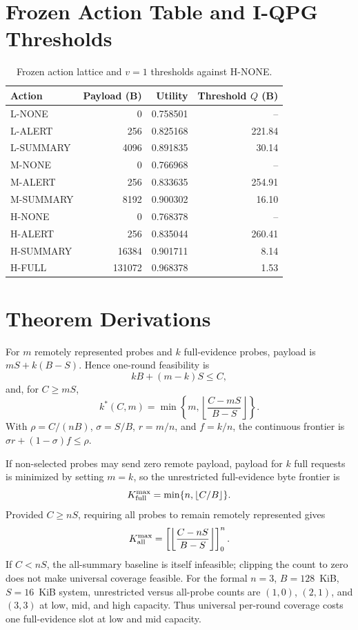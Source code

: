 \documentclass[10pt,onecolumn]{IEEEtran}
\begin{document}
\section{Frozen Action Table and I-QPG Thresholds}
\begin{table}[h]\centering\caption{Frozen action lattice and $v=1$ thresholds against H-NONE.}\begin{tabular}{lrrr}\toprule
Action & Payload (B) & Utility & Threshold $Q$ (B)\\\midrule
L-NONE&0&0.758501&--\\ L-ALERT&256&0.825168&221.84\\ L-SUMMARY&4096&0.891835&30.14\\
M-NONE&0&0.766968&--\\ M-ALERT&256&0.833635&254.91\\ M-SUMMARY&8192&0.900302&16.10\\
H-NONE&0&0.768378&--\\ H-ALERT&256&0.835044&260.41\\ H-SUMMARY&16384&0.901711&8.14\\ H-FULL&131072&0.968378&1.53\\\bottomrule
\end{tabular}\end{table}

\section{Theorem Derivations}
For $m$ remotely represented probes and $k$ full-evidence probes, payload is
$mS+k(B-S)$. Hence one-round feasibility is
\[kB+(m-k)S\le C,\]
and, for $C\ge mS$,
\[k^*(C,m)=\min\left\{m,\left\lfloor\frac{C-mS}{B-S}\right\rfloor\right\}.\]
With $\rho=C/(nB)$, $\sigma=S/B$, $r=m/n$, and $f=k/n$, the continuous
frontier is $\sigma r+(1-\sigma)f\le\rho$.

If non-selected probes may send zero remote payload, payload for $k$ full
requests is minimized by setting $m=k$, so the unrestricted full-evidence
byte frontier is
\[K_{\rm full}^{\max}=\min\{n,\lfloor C/B\rfloor\}.\]
Provided $C\geq nS$, requiring all probes to remain remotely represented gives
\[K_{\rm all}^{\max}=\left[\left\lfloor\frac{C-nS}{B-S}\right\rfloor\right]_0^n.\]
If $C<nS$, the all-summary baseline is itself infeasible; clipping the count
to zero does not make universal coverage feasible.
For the formal $n=3$, $B=128$~KiB, $S=16$~KiB system, unrestricted versus
all-probe counts are $(1,0)$, $(2,1)$, and $(3,3)$ at low, mid, and high
capacity. Thus universal per-round coverage costs one full-evidence slot at
low and mid capacity.
\end{document}
